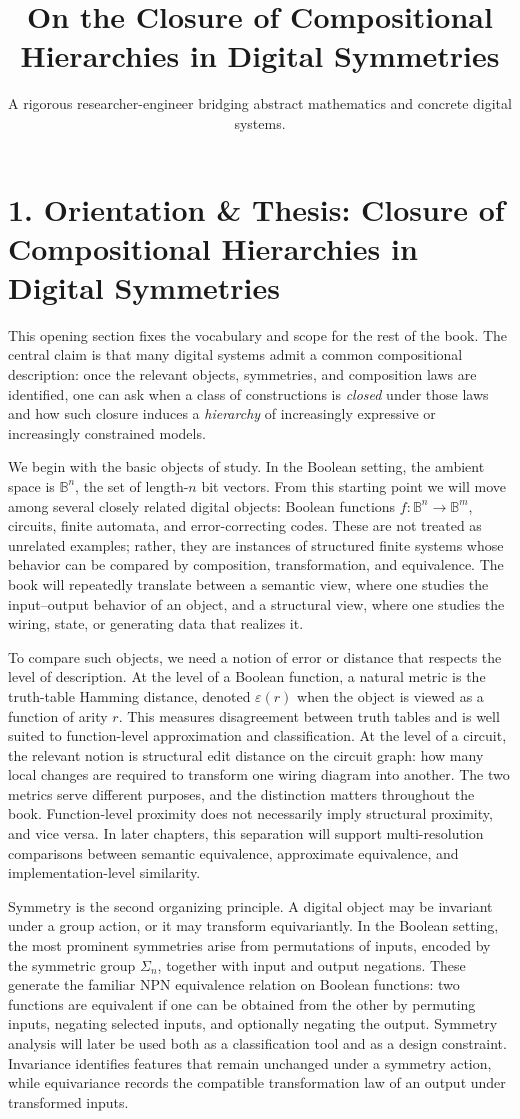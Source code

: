 \documentclass[11pt]{article}
\title{On the Closure of Compositional Hierarchies in Digital Symmetries}
\author{A rigorous researcher-engineer bridging abstract mathematics and concrete digital systems.}
\begin{document}
\section*{1. Orientation \& Thesis: Closure of Compositional Hierarchies in Digital Symmetries}

This opening section fixes the vocabulary and scope for the rest of the book. The central claim is that many digital systems admit a common compositional description: once the relevant objects, symmetries, and composition laws are identified, one can ask when a class of constructions is \emph{closed} under those laws and how such closure induces a \emph{hierarchy} of increasingly expressive or increasingly constrained models.

We begin with the basic objects of study. In the Boolean setting, the ambient space is \(\mathbb{B}^n\), the set of length-\(n\) bit vectors. From this starting point we will move among several closely related digital objects: Boolean functions \(f : \mathbb{B}^n \to \mathbb{B}^m\), circuits, finite automata, and error-correcting codes. These are not treated as unrelated examples; rather, they are instances of structured finite systems whose behavior can be compared by composition, transformation, and equivalence. The book will repeatedly translate between a semantic view, where one studies the input--output behavior of an object, and a structural view, where one studies the wiring, state, or generating data that realizes it.

To compare such objects, we need a notion of error or distance that respects the level of description. At the level of a Boolean function, a natural metric is the truth-table Hamming distance, denoted \(\varepsilon(r)\) when the object is viewed as a function of arity \(r\). This measures disagreement between truth tables and is well suited to function-level approximation and classification. At the level of a circuit, the relevant notion is structural edit distance on the circuit graph: how many local changes are required to transform one wiring diagram into another. The two metrics serve different purposes, and the distinction matters throughout the book. Function-level proximity does not necessarily imply structural proximity, and vice versa. In later chapters, this separation will support multi-resolution comparisons between semantic equivalence, approximate equivalence, and implementation-level similarity.

Symmetry is the second organizing principle. A digital object may be invariant under a group action, or it may transform equivariantly. In the Boolean setting, the most prominent symmetries arise from permutations of inputs, encoded by the symmetric group \(\Sigma_n\), together with input and output negations. These generate the familiar \(\mathrm{NPN}\) equivalence relation on Boolean functions: two functions are equivalent if one can be obtained from the other by permuting inputs, negating selected inputs, and optionally negating the output. Symmetry analysis will later be used both as a classification tool and as a design constraint. Invariance identifies features that remain unchanged under a symmetry action, while equivariance records the compatible transformation law of an output under transformed inputs.
\end{document}
